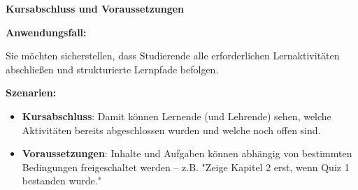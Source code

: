 \documentclass{article}
\newlength{\commonwidth}
\begin{document}
\begin{center}
\textbf{\textcolor{customred}{\LARGE Kursabschluss \faCheckCircle{} und Voraussetzungen \faLock}}
\end{center}

\vspace{0.5cm}

\begin{center}
\begin{minipage}{\commonwidth}
\begin{mdframed}[backgroundcolor=lightgray, linewidth=0pt, roundcorner=5pt]
\textbf{Anwendungsfall:}

Sie möchten sicherstellen, dass Studierende alle erforderlichen Lernaktivitäten abschließen und strukturierte Lernpfade befolgen.

\vspace{0.3cm}

\textbf{Szenarien:}
\begin{itemize}
\item \textbf{Kursabschluss}: Damit können Lernende (und Lehrende) sehen, welche Aktivitäten bereits abgeschlossen wurden und welche noch offen sind. 
\item \textbf{Voraussetzungen}: Inhalte und Aufgaben können abhängig von bestimmten Bedingungen freigeschaltet werden – z.B. "Zeige Kapitel 2 erst, wenn Quiz 1 bestanden wurde."
\end{itemize}
\end{mdframed}
\end{minipage}
\end{center}

\vspace{0.8cm}

\renewcommand{\arraystretch}{1.4}  %
\setlength{\tabcolsep}{8pt}        %
\end{document}
